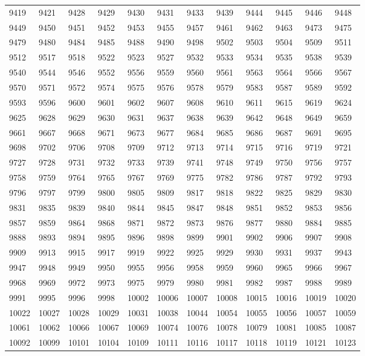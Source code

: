 \begin{center}
\begin{longtable}{llllllllllll}
9419 &9421 &9428 &9429 &9430 &9431 &9433 &9439 &9444 &9445 &9446 &9448 \\
9449 &9450 &9451 &9452 &9453 &9455 &9457 &9461 &9462 &9463 &9473 &9475 \\
9479 &9480 &9484 &9485 &9488 &9490 &9498 &9502 &9503 &9504 &9509 &9511 \\
9512 &9517 &9518 &9522 &9523 &9527 &9532 &9533 &9534 &9535 &9538 &9539 \\
9540 &9544 &9546 &9552 &9556 &9559 &9560 &9561 &9563 &9564 &9566 &9567 \\
9570 &9571 &9572 &9574 &9575 &9576 &9578 &9579 &9583 &9587 &9589 &9592 \\
9593 &9596 &9600 &9601 &9602 &9607 &9608 &9610 &9611 &9615 &9619 &9624 \\
9625 &9628 &9629 &9630 &9631 &9637 &9638 &9639 &9642 &9648 &9649 &9659 \\
9661 &9667 &9668 &9671 &9673 &9677 &9684 &9685 &9686 &9687 &9691 &9695 \\
9698 &9702 &9706 &9708 &9709 &9712 &9713 &9714 &9715 &9716 &9719 &9721 \\
9727 &9728 &9731 &9732 &9733 &9739 &9741 &9748 &9749 &9750 &9756 &9757 \\
9758 &9759 &9764 &9765 &9767 &9769 &9775 &9782 &9786 &9787 &9792 &9793 \\
9796 &9797 &9799 &9800 &9805 &9809 &9817 &9818 &9822 &9825 &9829 &9830 \\
9831 &9835 &9839 &9840 &9844 &9845 &9847 &9848 &9851 &9852 &9853 &9856 \\
9857 &9859 &9864 &9868 &9871 &9872 &9873 &9876 &9877 &9880 &9884 &9885 \\
9888 &9893 &9894 &9895 &9896 &9898 &9899 &9901 &9902 &9906 &9907 &9908 \\
9909 &9913 &9915 &9917 &9919 &9922 &9925 &9929 &9930 &9931 &9937 &9943 \\
9947 &9948 &9949 &9950 &9955 &9956 &9958 &9959 &9960 &9965 &9966 &9967 \\
9968 &9969 &9972 &9973 &9975 &9979 &9980 &9981 &9982 &9987 &9988 &9989 \\
9991 &9995 &9996 &9998 &10002 &10006 &10007 &10008 &10015 &10016 &10019 &10020 \\
10022 &10027 &10028 &10029 &10031 &10038 &10044 &10054 &10055 &10056 &10057 &10059 \\
10061 &10062 &10066 &10067 &10069 &10074 &10076 &10078 &10079 &10081 &10085 &10087 \\
10092 &10099 &10101 &10104 &10109 &10111 &10116 &10117 &10118 &10119 &10121 &10123 \\

\end{longtable}
\end{center}

